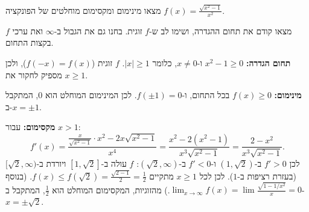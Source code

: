 
\begin{question}
מצאו מינימום ומקסימום מוחלטים של הפונקציה $f(x)=\frac{\sqrt{x^2-1}}{x^2}$.
\end{question}

\begin{hint}
מצאו קודם את תחום ההגדרה, ושימו לב ש-$f$ זוגית. בחנו גם את הגבול ב-$\infty$ ואת ערכי $f$ בקצות התחום.
\end{hint}

\begin{solution}
\textbf{תחום הגדרה:} $x^2-1\ge0$ ו-$x\ne0$, כלומר $|x|\ge1$. $f$ זוגית ($f(-x)=f(x)$), ולכן מספיק לחקור את $x\ge1$.

\textbf{מינימום:} $f(x)\ge0$ בכל התחום, ו-$f(\pm1)=0$. לכן המינימום המוחלט הוא $\boxed{0}$, המתקבל ב-$x=\pm1$.

\textbf{מקסימום:} עבור $x>1$:
\[ f'(x)=\frac{\frac{x}{\sqrt{x^2-1}}\cdot x^2-2x\sqrt{x^2-1}}{x^4}=\frac{x^2-2(x^2-1)}{x^3\sqrt{x^2-1}}=\frac{2-x^2}{x^3\sqrt{x^2-1}}. \]
לכן $f'>0$ ב-$(1,\sqrt2)$ ו-$f'<0$ ב-$(\sqrt2,\infty)$: $f$ עולה ב-$[1,\sqrt2]$ ויורדת ב-$[\sqrt2,\infty)$ (בעזרת רציפות ב-$1$). לכן לכל $x\ge1$ מתקיים $f(x)\le f(\sqrt2)=\frac{\sqrt{2-1}}{2}=\frac12$. (בנוסף $\lim_{x\to\infty}f(x)=\lim\frac{\sqrt{1-1/x^2}}{x}=0$.)
מהזוגיות, המקסימום המוחלט הוא $\boxed{\frac12}$, המתקבל ב-$x=\pm\sqrt2$.
\end{solution}
